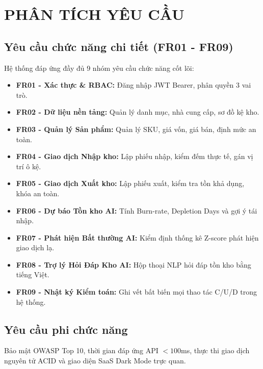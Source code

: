 \chapter{PHÂN TÍCH YÊU CẦU}
\label{ch:02}

\section{Yêu cầu chức năng chi tiết (FR01 - FR09)}
Hệ thống đáp ứng đầy đủ 9 nhóm yêu cầu chức năng cốt lõi:
\begin{itemize}
    \item \textbf{FR01 - Xác thực \& RBAC:} Đăng nhập JWT Bearer, phân quyền 3 vai trò.
    \item \textbf{FR02 - Dữ liệu nền tảng:} Quản lý danh mục, nhà cung cấp, sơ đồ kệ kho.
    \item \textbf{FR03 - Quản lý Sản phẩm:} Quản lý SKU, giá vốn, giá bán, định mức an toàn.
    \item \textbf{FR04 - Giao dịch Nhập kho:} Lập phiếu nhập, kiểm đếm thực tế, gán vị trí ô kệ.
    \item \textbf{FR05 - Giao dịch Xuất kho:} Lập phiếu xuất, kiểm tra tồn khả dụng, khóa an toàn.
    \item \textbf{FR06 - Dự báo Tồn kho AI:} Tính Burn-rate, Depletion Days và gợi ý tái nhập.
    \item \textbf{FR07 - Phát hiện Bất thường AI:} Kiểm định thống kê Z-score phát hiện giao dịch lạ.
    \item \textbf{FR08 - Trợ lý Hỏi Đáp Kho AI:} Hộp thoại NLP hỏi đáp tồn kho bằng tiếng Việt.
    \item \textbf{FR09 - Nhật ký Kiểm toán:} Ghi vết bất biến mọi thao tác C/U/D trong hệ thống.
\end{itemize}

\section{Yêu cầu phi chức năng}
Bảo mật OWASP Top 10, thời gian đáp ứng API $<100$ms, thực thi giao dịch nguyên tử ACID và giao diện SaaS Dark Mode trực quan.
